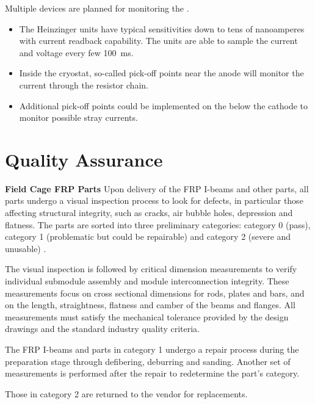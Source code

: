 Multiple devices are planned for monitoring the .  
\begin{itemize}
\item The Heinzinger units have typical sensitivities down to tens of nanoamperes with current readback capability.  The units are able to sample the current and voltage every few \SI{100}{\milli\s}.  
\item Inside the cryostat, so-called pick-off points near the anode will monitor the current through the  resistor chain.  

\item Additional pick-off points could be implemented on the  below the cathode to monitor possible stray currents.
\end{itemize}
\noindent 


\section{Quality Assurance}
\label{sec:fddp-hv-qa}

{\bf Field Cage FRP Parts} Upon delivery of the FRP I-beams and other parts, all parts undergo a visual inspection process to look for defects, in particular those affecting structural integrity, such as cracks, air bubble holes, depression and flatness. The parts are sorted into three preliminary categories: category 0 (pass), category 1 (problematic but could be repairable) and category 2 (severe and unusable) .

The visual inspection is followed by critical dimension measurements to verify individual submodule assembly and module interconnection integrity.  These measurements focus on cross sectional dimensions for rods, plates and bars, and on the length, straightness, flatness and camber of the beams and flanges.
All measurements must satisfy the mechanical tolerance provided by the design drawings and the standard industry quality criteria.

The FRP I-beams and parts in category 1 undergo a repair process during the preparation stage through defibering, deburring and sanding.  Another set of measurements is performed after the repair to redetermine the part's category.

Those in category 2 are returned to the vendor for replacements.

